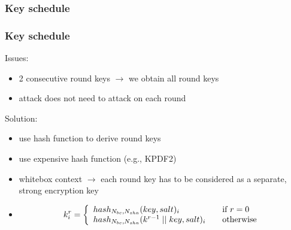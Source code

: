 \documentclass{beamer}
\begin{document}
\subsubsection{Key schedule}
\begin{frame}
    \frametitle{Key schedule}
    Issues:
    \begin{itemize}
     \item 2 consecutive round keys $\rightarrow$ we obtain all round keys
     \item attack does not need to attack on each round
    \end{itemize}
    
    \bigskip
    Solution:
    \begin{itemize}
     \item use hash function to derive round keys
     \item use expensive hash function (e.g., KPDF2)
     \item whitebox context $\rightarrow$ each round key has 
	   to be considered as a separate, strong encryption key
     \item 
    \begin{equation}\label{eq:keySchedule}
    k_i^r = \left\{ 
    \begin{array}{l l} 
	hash_{N_{bc}, N_{sha}}(key, salt)_i                   & \quad \text{if $r=0$}\\
	hash_{N_{bc}, N_{sha}}(k^{r-1} \; || \;  key, salt)_i & \quad \text{otherwise}
    \end{array} \right.
    \end{equation}
    \end{itemize}
\end{frame}
\end{document}
